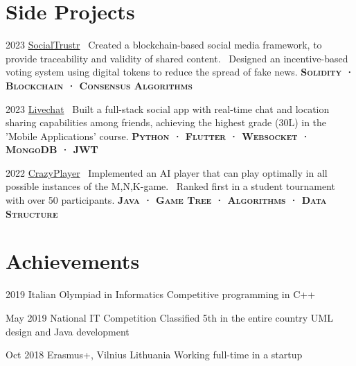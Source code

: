 \documentclass{tccv}
\begin{document}
\section{Side Projects}

\begin{yearlist}

\item{2023}
     {\href{https://github.com/manuelarto/socialtrustr}{SocialTrustr}}
     {\textbullet~Created a blockchain-based social media framework, to provide traceability and validity of shared content. \newline
     \textbullet~Designed an incentive-based voting system using digital tokens to reduce the spread of fake news. \newline
     \textbf{\textsc{Solidity · Blockchain · Consensus Algorithms}}}
\item{2023}
     {\href{https://github.com/manuelarto/livechat}{Livechat}}
     {\textbullet~Built a full-stack social app with real-time chat and location sharing capabilities among friends, achieving the highest grade (30L) in the 'Mobile Applications' course. \newline
    \textbf{\textsc{Python · Flutter · Websocket · MongoDB · JWT}}}
\item{2022}
     {\href{https://github.com/manuelarto/crazyplayer}{CrazyPlayer}}
     {\textbullet~Implemented an AI player that can play optimally in all possible instances of the M,N,K-game. \newline
     \textbullet~Ranked first in a student tournament with over 50 participants. \newline
    \textbf{\textsc{Java · Game Tree · Algorithms · Data Structure}}}

\end{yearlist}


\section{Achievements}

\begin{yearlist}

\item[]{2019}
     {Italian Olympiad in Informatics}
     {Competitive programming in C++}

\item[]{May 2019}
     {National IT Competition}
     {Classified 5th in the entire country \newline
     UML design and Java development}

\item[]{Oct 2018}
     {Erasmus+, Vilnius Lithuania}
     {Working full-time in a startup}

\end{yearlist}
\end{document}
